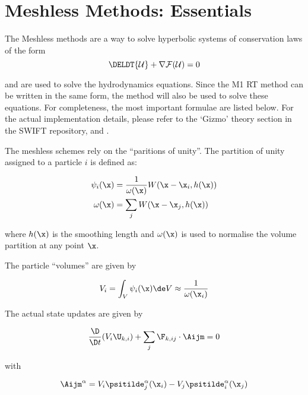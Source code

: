 \section{Meshless Methods: Essentials}

The Meshless methods are a way to solve hyperbolic systems of conservation laws of the form
\begin{equation}
		\DELDT{\mathcal{U}} + \nabla \mathcal{F}(\mathcal{U}) = 0 \label{eq:conservation-law}
\end{equation}

and are used to solve the hydrodynamics equations.
Since the M1 RT method can be written in the same form, the method will also be 
used to solve these equations. For completeness, the most important formulae are 
listed below. For the actual implementation details, please refer to the `Gizmo'
theory section in the SWIFT repository, and \cite{hopkinsGIZMONewClass2015}.



The meshless schemes rely on the ``paritions of unity''. 
The partition of unity assigned to a particle $i$ is defined as:

\begin{align}
	\psi_i(\x) &= \frac{1}{\omega(\x)} W(\x - \x_i, h(\x))		\label{psi} \\
	\omega(\x) &= \sum_j W(\x - \x_j, h(\x)) 					\label{omega}
\end{align}

where $h(\x)$ is the smoothing length and $\omega(\x)$ is used to normalise the 
volume partition at any point $\x$. 

The particle ``volumes'' are given by

\begin{align}
	V_i &= \int_V \psi_i(\x) \de V \approx \frac{1}{\omega(\x_i)} \\ \label{psi_volume_integral}
\end{align}


The actual state updates are given by

\begin{equation}
	\frac{\D}{\D t} (V_i \U_{k,i}) + \sum_j \F_{k,ij} \cdot \Aijm = 0
\end{equation}


with

\begin{equation}
	\Aijm^\alpha = V_i \psitilde_j^\alpha (\x_i) - V_j\psitilde_i^\alpha (\x_j) 			\label{eq:HopkinsAij}
\end{equation}

